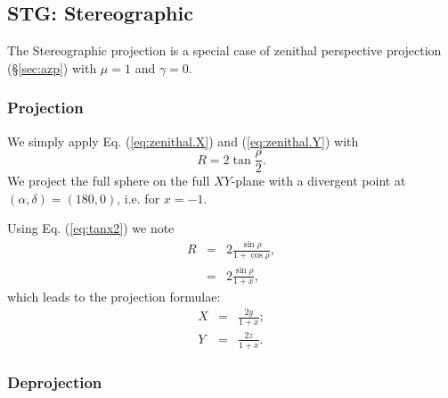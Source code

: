\subsection{STG: Stereographic}

  The Stereographic projection is a special case of zenithal perspective
  projection (\S \ref{sec:azp}) with $\mu=1$ and $\gamma=0$.
  
  \subsubsection{Projection}

    We simply apply Eq. (\ref{eq:zenithal.X}) and  (\ref{eq:zenithal.Y})
    with
    \begin{equation}
      R = 2\tan\frac{\rho}{2}.
    \end{equation}
    We project the full sphere on the full $XY$-plane with a divergent point at
    $(\alpha, \delta) = (180, 0)$,  i.e. for $x=-1$.

    Using Eq. (\ref{eq:tanx2}) we note
    \begin{eqnarray}
      R & = & 2\frac{\sin\rho}{1 + \cos\rho}, \\
        & = & 2\frac{\sin\rho}{1 + x},
    \end{eqnarray}
    which leads to the projection formulae:
    \begin{eqnarray}
      X & = & \frac{2y}{1 + x}; \label{eq:stg.proj.X} \\
      Y & = & \frac{2z}{1 + x}. \label{eq:stg.proj.Y}
    \end{eqnarray}

  \subsubsection{Deprojection}
     
